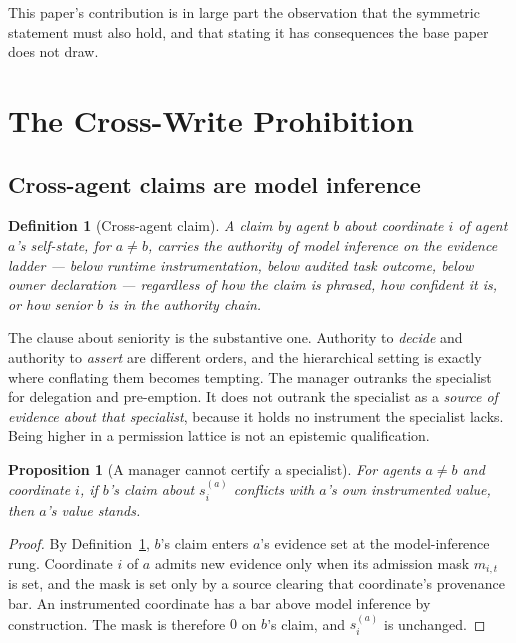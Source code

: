 \documentclass[11pt]{article}
\newtheorem{definition}{Definition}
\newtheorem{proposition}{Proposition}
\begin{document}
This paper's contribution is in large part the observation that the symmetric statement must also hold, and that stating it has consequences the base paper does not draw.

\section{The Cross-Write Prohibition}
\label{sec:crosswrite}

\subsection{Cross-agent claims are model inference}

\begin{definition}[Cross-agent claim]
\label{def:cross}
A claim by agent $b$ about coordinate $i$ of agent $a$'s self-state, for $a\neq b$, carries the authority of \emph{model inference} on the evidence ladder --- below runtime instrumentation, below audited task outcome, below owner declaration --- regardless of how the claim is phrased, how confident it is, or how senior $b$ is in the authority chain.
\end{definition}

The clause about seniority is the substantive one. Authority to \emph{decide} and authority to \emph{assert} are different orders, and the hierarchical setting is exactly where conflating them becomes tempting. The manager outranks the specialist for delegation and pre-emption. It does not outrank the specialist as a \emph{source of evidence about that specialist}, because it holds no instrument the specialist lacks. Being higher in a permission lattice is not an epistemic qualification.

\begin{proposition}[A manager cannot certify a specialist]
\label{prop:nocertify}
For agents $a\neq b$ and coordinate $i$, if $b$'s claim about $s^{(a)}_i$ conflicts with $a$'s own instrumented value, then $a$'s value stands.
\end{proposition}

\begin{proof}
By Definition~\ref{def:cross}, $b$'s claim enters $a$'s evidence set at the model-inference rung. Coordinate $i$ of $a$ admits new evidence only when its admission mask $m_{i,t}$ is set, and the mask is set only by a source clearing that coordinate's provenance bar. An instrumented coordinate has a bar above model inference by construction. The mask is therefore $0$ on $b$'s claim, and $s^{(a)}_i$ is unchanged.
\end{proof}
\end{document}
